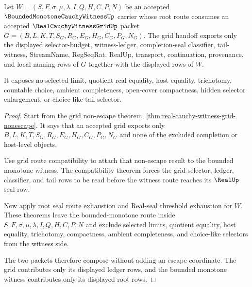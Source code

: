 \begin{theorem}
\label{thm:bounded-monotone-cauchy-witness-grid-ledger-nonescape}
Let $W=(S,F,\sigma,\mu,\lambda,I,Q,H,C,P,N)$ be an accepted $\BoundedMonotoneCauchyWitnessUp$ carrier whose root route consumes an accepted $\RealCauchyWitnessGridUp$ packet $G=(B,L,K,T,S_G,R_G,E_G,H_G,C_G,P_G,N_G)$. The grid handoff exports only the displayed selector-budget, witness-ledger, completion-seal classifier, tail-witness, StreamName, RegSeqRat, RealUp, transport, continuation, provenance, and local naming rows of $G$ together with the displayed rows of $W$.

It exposes no selected limit, quotient real equality, host equality, trichotomy, countable choice, ambient completeness, open-cover compactness, hidden selector enlargement, or choice-like tail selector.
\end{theorem}
\begin{proof}
Start from the grid non-escape theorem, \autoref{thm:real-cauchy-witness-grid-nonescape}. It says that an accepted grid exports only $B,L,K,T,S_G,R_G,E_G,H_G,C_G,P_G,N_G$ and none of the excluded completion or host-level objects.

Use grid route compatibility to attach that non-escape result to the bounded monotone witness. The compatibility theorem forces the grid selector, ledger, classifier, and tail rows to be read before the witness route reaches its $\RealUp$ seal row.

Now apply root seal route exhaustion and Real-seal threshold exhaustion for $W$. These theorems leave the bounded-monotone route inside $S,F,\sigma,\mu,\lambda,I,Q,H,C,P,N$ and exclude selected limits, quotient equality, host equality, trichotomy, compactness, ambient completeness, and choice-like selectors from the witness side.

The two packets therefore compose without adding an escape coordinate. The grid contributes only its displayed ledger rows, and the bounded monotone witness contributes only its displayed root rows.
\end{proof}

